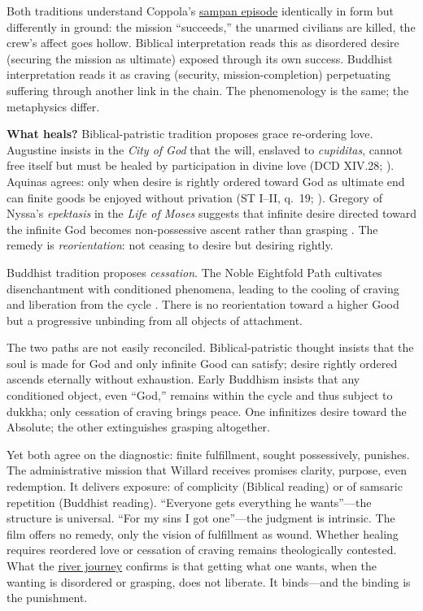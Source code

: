 Both traditions understand Coppola's \hyperref[scene:sampan]{sampan episode} identically in
form but differently in ground: the mission ``succeeds,'' the unarmed civilians are killed,
the crew's affect goes hollow. Biblical interpretation reads this as disordered desire
(securing the mission as ultimate) exposed through its own success. Buddhist interpretation
reads it as craving (security, mission-completion) perpetuating suffering through another link
in the chain. The
phenomenology is the same; the metaphysics differ.

\textbf{What heals?} Biblical-patristic tradition proposes grace re-ordering love. Augustine
insists in the \emph{City of God} that the will, enslaved to \emph{cupiditas}, cannot free
itself but must be healed by participation in divine love (DCD XIV.28;
\parencite{AugustineCity2003}). Aquinas agrees: only when desire is rightly ordered toward God
as ultimate end can finite goods be enjoyed without privation (ST I--II, q.~19;
\parencite{AquinasST1947}). Gregory of Nyssa's \emph{epektasis} in the \emph{Life of Moses}
suggests that infinite desire directed toward the infinite God becomes non-possessive ascent
rather than grasping \parencite[pp.~113--114]{GregoryMoses1978}. The remedy is
\emph{reorientation}: not ceasing to desire but desiring rightly.

Buddhist tradition proposes \emph{cessation}. The Noble Eightfold Path cultivates
disenchantment with conditioned phenomena, leading to the cooling of craving and liberation
from the cycle \parencite[pp.~45--50]{Rahula1959}. There is no reorientation toward a higher
Good but a progressive unbinding from all objects of attachment.

The two paths are not easily reconciled. Biblical-patristic thought insists that the soul is
made for God and only infinite Good can satisfy; desire rightly ordered ascends eternally
without exhaustion. Early Buddhism insists that any conditioned object, even ``God,'' remains
within the cycle and thus subject to dukkha; only cessation of craving brings peace. One
infinitizes desire toward the Absolute; the other extinguishes grasping altogether.

Yet both agree on the diagnostic: finite fulfillment, sought possessively, punishes. The
administrative mission that Willard receives promises clarity, purpose, even redemption. It
delivers exposure: of complicity (Biblical reading) or of samsaric repetition (Buddhist
reading). ``Everyone gets everything he wants''---the structure is universal. ``For my sins I
got one''---the judgment is intrinsic. The film offers no remedy, only the vision of
fulfillment as wound. Whether healing requires reordered love or cessation of craving remains
theologically contested. What the \hyperref[scene:upriver-journey]{river journey} confirms is
that getting what one wants, when the wanting is disordered or grasping, does not liberate. It
binds---and the binding is the punishment.
